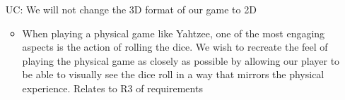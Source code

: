 \begin{itemize}
\item[UC\refstepcounter{ucnum}\theucnum \label{ULC_3D}:] We will not change the 3D format of our game to 2D

\begin{itemize}
	\item When playing a physical game like Yahtzee, one of the most engaging aspects is the action of rolling the dice. We wish to recreate the feel of playing the physical game as closely as possible by allowing our player to be able to visually see the dice roll in a way that mirrors the physical experience. Relates to R3 of requirements
	
	 
\end{itemize}




	


\end{itemize}